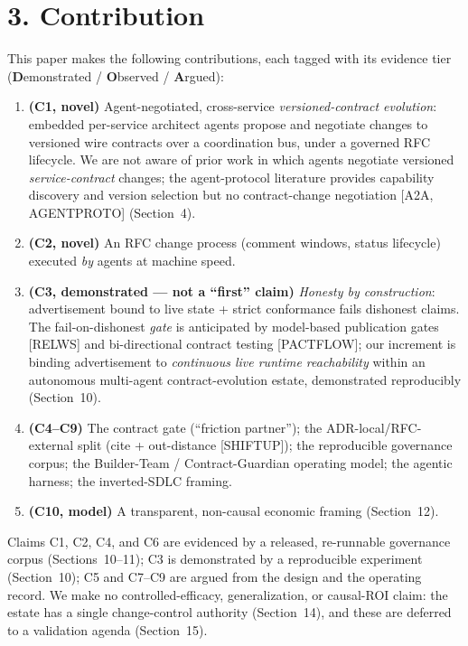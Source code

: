 \documentclass[11pt]{article}
\begin{document}
\section*{3. Contribution}
This paper makes the following contributions, each tagged with its evidence tier
(\textbf{D}emonstrated / \textbf{O}bserved / \textbf{A}rgued):
\begin{enumerate}[leftmargin=*]
  \item \textbf{(C1, novel)} Agent-negotiated, cross-service \emph{versioned-contract evolution}:
        embedded per-service architect agents propose and negotiate changes to versioned wire
        contracts over a coordination bus, under a governed RFC lifecycle. We are not aware of prior
        work in which agents negotiate versioned \emph{service-contract} changes; the agent-protocol
        literature provides capability discovery and version selection but no contract-change
        negotiation [A2A, AGENTPROTO] (Section~4).
  \item \textbf{(C2, novel)} An RFC change process (comment windows, status lifecycle) executed \emph{by}
        agents at machine speed.
  \item \textbf{(C3, demonstrated --- not a ``first'' claim)} \emph{Honesty by construction}:
        advertisement bound to live state + strict conformance fails dishonest claims. The
        fail-on-dishonest \emph{gate} is anticipated by model-based publication gates [RELWS] and
        bi-directional contract testing [PACTFLOW]; our increment is binding advertisement to
        \emph{continuous live runtime reachability} within an autonomous multi-agent
        contract-evolution estate, demonstrated reproducibly (Section~10).
  \item \textbf{(C4--C9)} The contract gate (``friction partner''); the ADR-local/RFC-external split
        (cite + out-distance [SHIFTUP]); the reproducible governance corpus; the Builder-Team /
        Contract-Guardian operating model; the agentic harness; the inverted-SDLC framing.
  \item \textbf{(C10, model)} A transparent, non-causal economic framing (Section~12).
\end{enumerate}
Claims C1, C2, C4, and C6 are evidenced by a released, re-runnable governance corpus
(Sections~10--11); C3 is demonstrated by a reproducible experiment (Section~10); C5 and C7--C9 are
argued from the design and the operating record. We make no controlled-efficacy, generalization, or
causal-ROI claim: the estate has a single change-control authority (Section~14), and these are
deferred to a validation agenda (Section~15).
\end{document}
